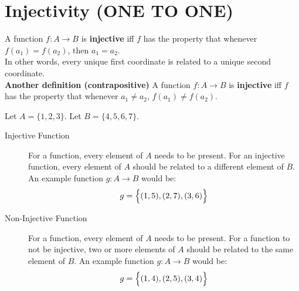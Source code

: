 \documentclass[../notes.tex]{subfiles}
\begin{document}
		\section[Injectivity]{Injectivity (ONE TO ONE)}
			A function $f: A \rightarrow B$ is \textbf{injective} iff $f$ has the property that whenever $f(a_{1}) = f(a_{2})$, then $a_{1} = a_{2}$.\\
			In other words, every unique first coordinate is related to a unique second coordinate.\\
			\textbf{Another definition (contrapositive)} A function $f: A \rightarrow B$ is \textbf{injective} iff $f$ has the property that whenever $a_{1} \neq a_{2}$, $f(a_{1}) \neq f(a_{2})$.
			\begin{example}
				Let $A = \{1, 2, 3\}$. Let $B = \{4, 5, 6, 7\}$.
				\begin{description}
					\item[Injective Function] For a function, every element of $A$ needs to be present. For an injective function, every element of $A$ should be related to a different element of $B$. An example function $g: A \rightarrow B$ would be:
						\begin{align*}
							g = \Bigl\{(1, 5), (2, 7), (3, 6)\Bigr\}
						\end{align*}
					\item[Non-Injective Function] For a function, every element of $A$ needs to be present. For a function to not be injective, two or more elements of $A$ should be related to the same element of $B$. An example function $g: A \rightarrow B$ would be:
						\begin{align*}
							g = \Bigl\{(1, 4), (2, 5), (3, 4)\Bigr\}
						\end{align*}
				\end{description}
			\end{example}
\end{document}
